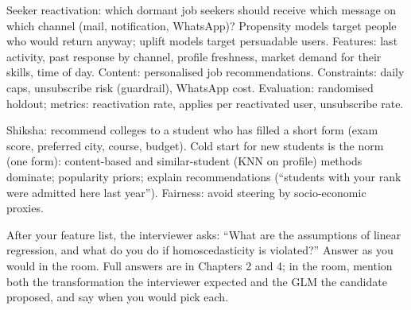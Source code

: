 \begin{qa}{\deep Seeker reactivation: which dormant job seekers should receive which message on which channel (mail, notification, WhatsApp)?}
\why Propensity models target people who would return anyway; uplift models target persuadable users. Features: last activity, past response by channel, profile freshness, market demand
for their skills, time of day. Content: personalised job recommendations. Constraints: daily caps, unsubscribe risk (guardrail), WhatsApp cost. Evaluation: randomised holdout; metrics:
reactivation rate, applies per reactivated user, unsubscribe rate.
\end{qa}

\begin{qa}{\deep Shiksha: recommend colleges to a student who has filled a short form (exam score, preferred city, course, budget).}
\why Cold start for new students is the norm (one form): content-based and similar-student (KNN on profile) methods dominate; popularity priors; explain recommendations (``students with your
rank were admitted here last year''). Fairness: avoid steering by socio-economic proxies.
\end{qa}

\begin{qa}{ After your feature list, the interviewer asks: ``What are the assumptions of linear regression, and what do you do if homoscedasticity is
violated?'' Answer as you would in the room.}
\why Full answers are in Chapters 2 and 4; in the room, mention both the transformation the interviewer expected and the GLM the candidate proposed, and say when you would pick each.
\end{qa}

